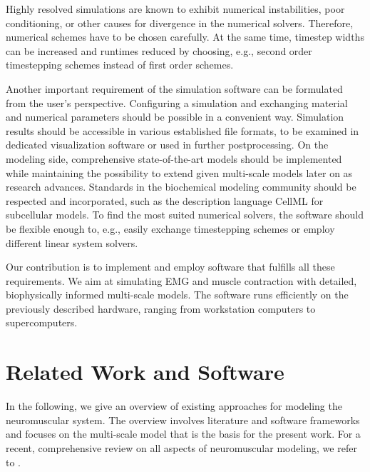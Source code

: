 Highly resolved simulations are known to exhibit numerical instabilities, poor conditioning, or other causes for divergence in the numerical solvers. Therefore, numerical schemes have to be chosen carefully. At the same time, timestep widths can be increased and runtimes reduced by choosing, e.g., second order timestepping schemes instead of first order schemes.

Another important requirement of the simulation software can be formulated from the user's perspective. 
Configuring a simulation and exchanging material and numerical parameters should be possible in a convenient way. Simulation results should be accessible in various established file formats, to be examined in dedicated visualization software or used in further postprocessing. On the modeling side, comprehensive state-of-the-art models should be implemented while maintaining the possibility to extend given multi-scale models later on as research advances. 
Standards in the biochemical modeling community should be respected and incorporated, such as the description language CellML \cite{Cellml2003,Lloyd2004} for subcellular models.
To find the most suited numerical solvers, the software should be flexible enough to, e.g., easily exchange timestepping schemes or employ different linear system solvers.

Our contribution is to implement and employ software that fulfills all these requirements. We aim at
simulating EMG and muscle contraction with detailed, biophysically informed multi-scale models. The software runs efficiently on the previously described hardware, ranging from workstation computers to supercomputers.

\section{Related Work and Software}\label{sec:intro_related_works}

In the following, we give an overview of existing approaches for modeling the neuromuscular system. The overview involves literature and software frameworks and focuses on the multi-scale model that is the basis for the present work. For a recent, comprehensive review on all aspects of neuromuscular modeling, we refer to \cite{Rohrle2019Review}.

